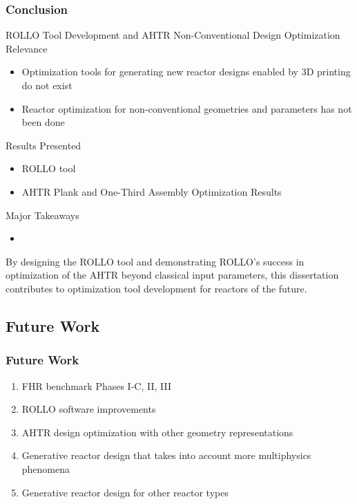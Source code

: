 \begin{frame}
    \frametitle{Conclusion}
    \begin{block}{ROLLO Tool Development and AHTR Non-Conventional Design Optimization}
        Relevance
        \begin{itemize}
            \item Optimization tools for generating new reactor designs enabled by
            3D printing do not exist
            \item Reactor optimization for non-conventional geometries and parameters 
            has not been done 
        \end{itemize}
        Results Presented
        \begin{itemize}
            \item \acrfull{ROLLO} tool 
            \item AHTR Plank and One-Third Assembly Optimization Results 
        \end{itemize}
        Major Takeaways 
        \begin{itemize}
            \item 
        \end{itemize}
    \end{block}

    By designing the \gls{ROLLO} tool and demonstrating \gls{ROLLO}'s success in 
    optimization of the \gls{AHTR} beyond classical input parameters, this dissertation 
    contributes to optimization tool development for reactors of the future. 
\end{frame}

\subsection{Future Work}
\begin{frame}
    \frametitle{Future Work}
    \begin{enumerate}
        \item FHR benchmark Phases I-C, II, III
        \item ROLLO software improvements 
        \item AHTR design optimization with other geometry representations 
        \item Generative reactor design that takes into account more multiphysics phenomena 
        \item Generative reactor design for other reactor types
    \end{enumerate}
\end{frame}
